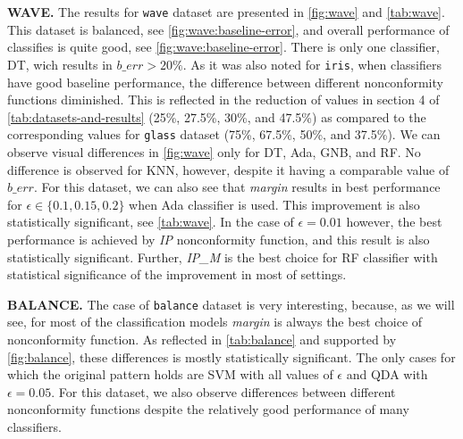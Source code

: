 \textbf{WAVE.}
The results for \verb|wave| dataset are presented in \cref{fig:wave} and \cref{tab:wave}.
This dataset is balanced, see \cref{fig:wave:baseline-error}, and overall performance of classifies 
is quite good, see \cref{fig:wave:baseline-error}. There is only one classifier, DT, wich results in 
$b\_err > 20\%$. 
As it was also noted for \verb|iris|, when classifiers have good baseline performance, the 
difference between different nonconformity functions diminished.
This is reflected in the reduction of values in section 4 of \cref{tab:datasets-and-results} (25\%, 
27.5\%, 30\%, and 47.5\%) as compared to the corresponding values for \verb|glass| dataset 
(75\%, 67.5\%, 50\%, and 37.5\%).
We can observe visual differences in \cref{fig:wave} only for DT, Ada, GNB, and RF.
No difference is observed for KNN, however, despite it having a comparable value of $b\_err$. 
For this dataset, we can also see that \textit{margin} results in best performance for $\epsilon \in \{ 0.1, 0.15, 0.2\}$ when Ada classifier is used.
This improvement is also statistically significant, see \cref{tab:wave}. 
In the case of $\epsilon = 0.01$ however, the best performance is achieved by \textit{IP} nonconformity 
function, and this result is also statistically significant.
Further, \textit{IP\_M} is the best choice for RF classifier with statistical significance of the improvement in most of settings.






\textbf{BALANCE.}
The case of \verb|balance| dataset is very interesting, because, as we will see, for most of the 
classification models \textit{margin} is always the best choice of nonconformity function.
As reflected in \cref{tab:balance} and supported by \cref{fig:balance}, these differences
is mostly statistically significant.
The only cases for which the original pattern holds are SVM with all values of $\epsilon$ 
and QDA with $\epsilon=0.05$. For this dataset, we also observe differences between different
nonconformity functions despite the relatively good performance of many classifiers. 




